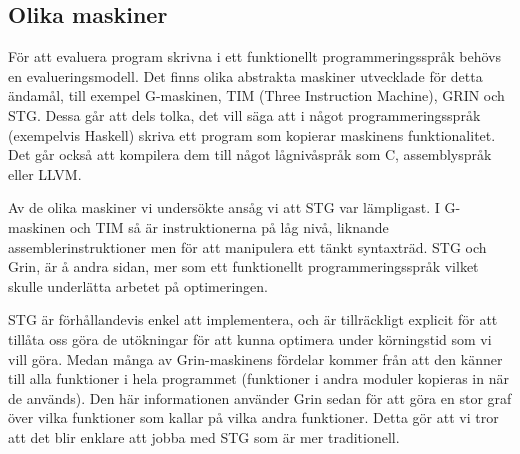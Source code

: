 \documentclass[../Core]{subfiles}
\begin{document}


\subsection{Olika maskiner}
\label{sec:Core:Mask}

För att evaluera program skrivna i ett funktionellt programmeringsspråk
behövs en evalueringsmodell. Det finns olika abstrakta maskiner utvecklade för
detta ändamål, till exempel G-maskinen, TIM (Three Instruction Machine), GRIN \cite{grin} och STG.
Dessa går att dels tolka, det vill säga att i något programmeringsspråk (exempelvis
Haskell) skriva ett program som kopierar maskinens funktionalitet. Det går också att
kompilera dem till något lågnivåspråk som C, assemblyspråk eller LLVM.


Av de olika maskiner vi undersökte ansåg vi att STG var lämpligast. I G-maskinen och TIM så är
instruktionerna på låg nivå, liknande assemblerinstruktioner men för att manipulera
ett tänkt syntaxträd. STG och Grin, är å andra sidan, mer som ett funktionellt
programmeringsspråk vilket skulle underlätta arbetet på optimeringen.

STG är förhållandevis enkel att implementera, och är tillräckligt explicit för att
tillåta oss göra de utökningar för att kunna optimera under körningstid som vi vill
göra. Medan många av Grin-maskinens fördelar kommer från att den känner till alla funktioner i hela
programmet (funktioner i andra moduler kopieras in när de används). Den här informationen
använder Grin sedan för att göra en stor graf över vilka funktioner som kallar på
vilka andra funktioner. Detta gör att vi tror att det blir enklare att jobba med STG 
som är mer traditionell.
\end{document}
